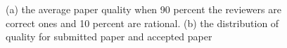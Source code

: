 \documentclass[11pt]{article}
\begin{document}
\begin{figure}[!th]
    \centering
    \qquad
    \caption{(a) the average paper quality when 90 percent the reviewers are correct ones and 10 percent are rational. (b) the distribution of quality for submitted paper and accepted paper}
    \label{fig:cont}
\end{figure}
\end{document}
